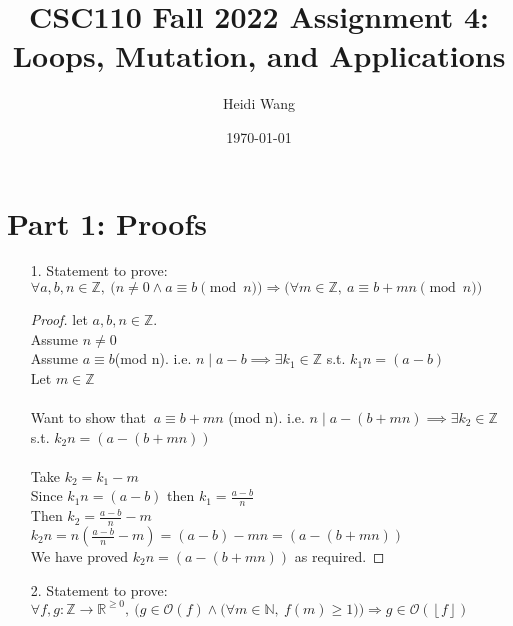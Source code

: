 \documentclass[11pt]{article}
\title{CSC110 Fall 2022 Assignment 4: Loops, Mutation, and Applications}
\author{Heidi Wang}
\date{\today}
\newcommand{\floor}[1]{\left\lfloor #1 \right\rfloor}
\begin{document}
\maketitle


\section*{Part 1: Proofs}

\begin{enumerate}
\item[1.] Statement to prove:
$\forall a, b, n \in \mathbb{Z},~ \big(n \neq 0 \land a \equiv b \pmod n \big) \Rightarrow \big(\forall m \in \mathbb{Z},~ a \equiv b + mn \pmod n\big)$

\begin{proof}
let $a, b, n \in \mathbb{Z}$.\\
Assume $n\neq 0$ \\
Assume $a \equiv b$\hspace{1mm}(mod n). i.e. $n\mid a-b \implies \exists k_{1} \in \mathbb{Z}$ s.t. $k_{1}n = (a-b)$\\
Let $m \in \mathbb{Z}$ \\
\\
Want to show that $~ a \equiv b + mn$ (mod n). i.e. $n\mid a - (b + mn) \implies \exists k_{2}
\in \mathbb{Z}$ s.t. $k_{2}n = (a - (b + mn))$ \\
\\
Take $k_{2} = k_{1} - m$\\
Since  $k_{1}n = (a-b)$ then $k_{1} = \frac{a-b}{n}$ \\
Then $k_{2} = \frac{a-b}{n} - m$ \\
$k_{2}n = n(\frac{a-b}{n} - m) = (a-b) - mn = (a - (b + mn)) $ \\
We have proved $k_{2}n = (a - (b + mn))$ as required.

\end{proof}

\newpage

\item[2.] Statement to prove:
$
\forall f, g: \mathbb{Z} \to \mathbb{R}^{\geq 0},~
\Big(g \in \mathcal{O}(f) \land \big(\forall m \in \mathbb{N},~ f(m) \geq 1) \Big) \Rightarrow
g \in \mathcal{O}(\floor{f})
$


\end{enumerate}
\end{document}
